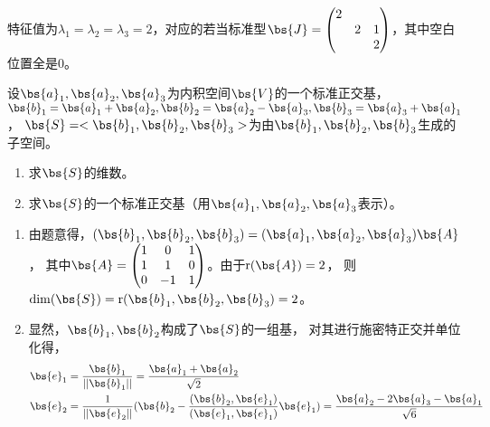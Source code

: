 \documentclass[12pt, a4paper, oneside, UTF8]{ctexbook}
\begin{document}
\begin{solution}
    特征值为$\lambda_1=\lambda_2=\lambda_3=2$，对应的若当标准型$\bs{J}=\begin{pmatrix}
        2 & & \\
        & 2& 1\\
        & & 2
    \end{pmatrix}$，其中空白位置全是$0$。

\end{solution}


\begin{question}
    设$\bs{a}_1,\bs{a}_2,\bs{a}_3$为内积空间$\bs{V}$的一个标准正交基，
    $\bs{b}_1=\bs{a}_1+\bs{a}_2,\bs{b}_2=\bs{a}_2-\bs{a}_3,\bs{b}_3=\bs{a}_3+\bs{a}_1$，
    $\bs{S}=<\bs{b}_1,\bs{b}_2,\bs{b}_3>$为由$\bs{b}_1,\bs{b}_2,\bs{b}_3$生成的子空间。
    \begin{enumerate}[label=(\arabic{*})]
        \item 求$\bs{S}$的维数。
        \item 求$\bs{S}$的一个标准正交基（用$\bs{a}_1,\bs{a}_2,\bs{a}_3$表示）。
    \end{enumerate}
\end{question}

\begin{solution}
    \begin{enumerate}[label=(\arabic{*})]
        \item 由题意得，$(\bs{b}_1,\bs{b}_2,\bs{b}_3)=(\bs{a}_1,\bs{a}_2,\bs{a}_3)\bs{A}$，
        其中$\bs{A}=\begin{pmatrix}
            1&0&1\\
            1&1&0\\
            0&-1&1
        \end{pmatrix}$。由于$\mathrm{r}(\bs{A})=2$，
        则$\mathrm{dim}(\bs{S})=\mathrm{r}(\bs{b}_1,\bs{b}_2,\bs{b}_3)=2$。
        \item 显然，$\bs{b}_1,\bs{b}_2$构成了$\bs{S}$的一组基，
        对其进行施密特正交并单位化得，
        \begin{align*}
            \bs{e}_1&=\frac{\bs{b}_1}{||\bs{b}_1||}=\frac{\bs{a}_1+\bs{a}_2}{\sqrt{2}} \\
            \bs{e}_2&=\frac{1}{||\bs{e}_2||}(\bs{b}_2-\frac{(\bs{b}_2,\bs{e}_1)}{(\bs{e}_1,\bs{e}_1)}\bs{e}_1
            )=\frac{\bs{a}_2- 2\bs{a}_3-\bs{a}_1}{\sqrt{6}}
        \end{align*}
    \end{enumerate}
\end{solution}
\end{document}
